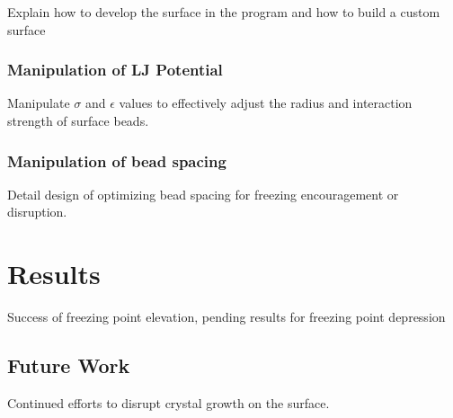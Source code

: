 Explain how to develop the surface in the program and how to build a custom surface 

\subsubsection{Manipulation of LJ Potential}

Manipulate $\sigma$ and $\epsilon$ values to effectively adjust the radius and interaction strength of surface beads.

\subsubsection{Manipulation of bead spacing}

Detail design of optimizing bead spacing for freezing encouragement or disruption.

\section{Results}

Success of freezing point elevation, pending results for freezing point depression

\subsection{Future Work}

Continued efforts to disrupt crystal growth on the surface. 



